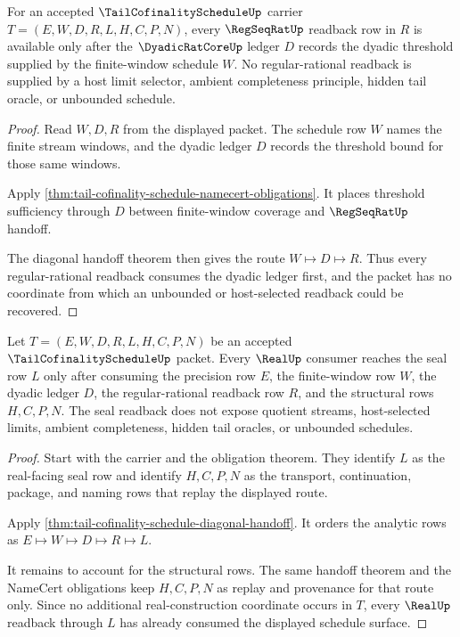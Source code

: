 \begin{theorem}
\label{thm:tail-cofinality-schedule-threshold-sufficiency}
For an accepted $\TailCofinalityScheduleUp$ carrier $T=(E,W,D,R,L,H,C,P,N)$, every $\RegSeqRatUp$ readback row in $R$ is available only after the $\DyadicRatCoreUp$ ledger $D$ records the dyadic threshold supplied by the finite-window schedule $W$. No regular-rational readback is supplied by a host limit selector, ambient completeness principle, hidden tail oracle, or unbounded schedule.
\end{theorem}
\begin{proof}
Read $W,D,R$ from the displayed packet. The schedule row $W$ names the finite stream windows, and the dyadic ledger $D$ records the threshold bound for those same windows.

Apply \autoref{thm:tail-cofinality-schedule-namecert-obligations}. It places threshold sufficiency through $D$ between finite-window coverage and $\RegSeqRatUp$ handoff.

The diagonal handoff theorem then gives the route $W \longmapsto D \longmapsto R$. Thus every regular-rational readback consumes the dyadic ledger first, and the packet has no coordinate from which an unbounded or host-selected readback could be recovered.
\end{proof}

\begin{theorem}
\label{thm:tail-cofinality-schedule-real-seal-readback}
Let $T=(E,W,D,R,L,H,C,P,N)$ be an accepted $\TailCofinalityScheduleUp$ packet. Every $\RealUp$ consumer reaches the seal row $L$ only after consuming the precision row $E$, the finite-window row $W$, the dyadic ledger $D$, the regular-rational readback row $R$, and the structural rows $H,C,P,N$. The seal readback does not expose quotient streams, host-selected limits, ambient completeness, hidden tail oracles, or unbounded schedules.
\end{theorem}
\begin{proof}
Start with the carrier and the obligation theorem. They identify $L$ as the real-facing seal row and identify $H,C,P,N$ as the transport, continuation, package, and naming rows that replay the displayed route.

Apply \autoref{thm:tail-cofinality-schedule-diagonal-handoff}. It orders the analytic rows as $E \longmapsto W \longmapsto D \longmapsto R \longmapsto L$.

It remains to account for the structural rows. The same handoff theorem and the NameCert obligations keep $H,C,P,N$ as replay and provenance for that route only. Since no additional real-construction coordinate occurs in $T$, every $\RealUp$ readback through $L$ has already consumed the displayed schedule surface.
\end{proof}

